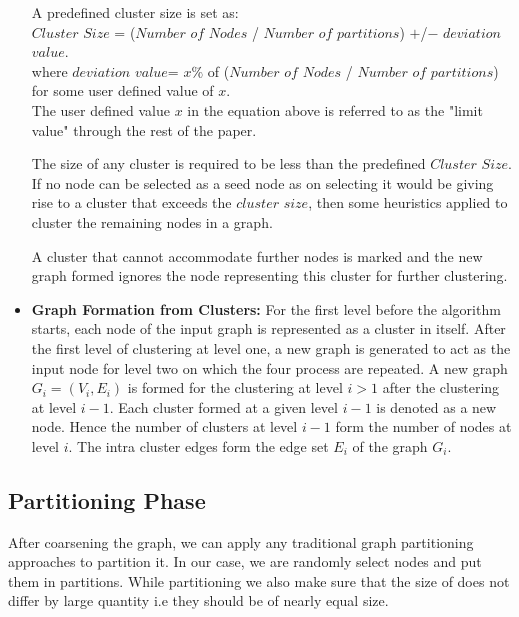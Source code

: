 \documentclass[letterpaper]{article}
\begin{document}
\begin{itemize}
\begin{itemize}
\end{itemize} %

A predefined cluster size is set as:\\

$Cluster$ $Size$ = ($Number$ $of$ $Nodes$ / $Number$ $of$ $partitions$) $+$/$-$
$deviation$ $value$.\\

where $deviation$ $value$= $x\%$ of ($Number$ $of$ $Nodes$ / $Number$ $of$
$partitions$) for some user defined value of $x$.\\ 


The user defined value $x$ in the equation above is referred to as the "limit
value" through the rest of the paper.

The size of any cluster is required to be less than the predefined $Cluster$
$Size$. If no node can be selected as a seed node as on selecting it would be
giving rise to a cluster that exceeds the $cluster$ $size$, then some
heuristics applied to cluster the remaining nodes in a graph.  

A cluster that cannot accommodate further nodes is marked and the new graph
formed ignores the node representing this cluster for further clustering. 



\item \textbf{Graph Formation from Clusters:} For the first level before the
algorithm starts, each node of the input graph is represented as a cluster in
itself. After the first level of clustering at level one, a new graph is
generated to act as the input node for level two on which the four process are
repeated. A new graph $G_i=(V_i, E_i)$ is formed for the clustering at level $i
> 1$ after the clustering at level $i-1$. Each cluster formed at a given level
$i-1$ is denoted as a new node. Hence the number of clusters at level $i-1$
form the number of nodes at level $i$. The intra cluster edges form the edge
set $E_i$ of the graph $G_i$.




\end{itemize} %

\subsection{Partitioning Phase}
After coarsening the graph, we can apply any traditional graph partitioning
approaches to partition it. In our case, we are randomly select nodes and put
them in partitions. While partitioning we also make sure that the size of does
not differ by large quantity i.e they should be of nearly equal size.
\end{document}
